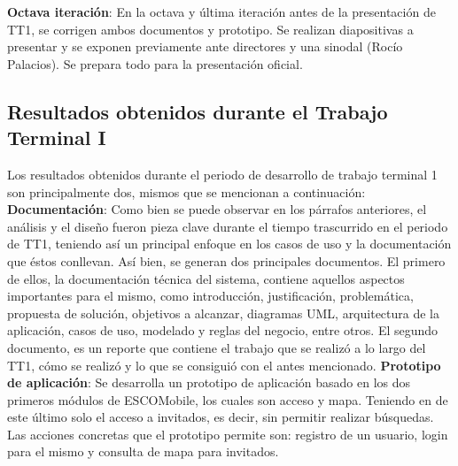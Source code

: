 \noindent
\textbf{Octava iteración}: En la octava y última iteración antes de la presentación de TT1, se corrigen ambos documentos y prototipo. Se realizan diapositivas a presentar y se exponen previamente ante directores y una sinodal (Rocío Palacios). Se prepara todo para la presentación oficial.

\subsection{Resultados obtenidos durante el Trabajo Terminal I}

\noindent
Los resultados obtenidos durante el periodo de desarrollo de trabajo terminal 1 son principalmente dos, mismos que se mencionan a continuación:
\newline
\newline
\textbf{Documentación}: Como bien se puede observar en los párrafos anteriores, el análisis y el diseño fueron pieza clave durante el tiempo trascurrido en el periodo de TT1, teniendo así un principal enfoque en los casos de uso y la documentación que éstos conllevan. Así bien, se generan dos principales documentos. El primero de ellos, la documentación técnica del sistema, contiene aquellos aspectos importantes para el mismo, como introducción, justificación, problemática, propuesta de solución, objetivos a alcanzar, diagramas UML, arquitectura de la aplicación, casos de uso, modelado y reglas del negocio, entre otros. El segundo documento, es un reporte que contiene el trabajo que se realizó a lo largo del TT1, cómo se realizó y lo que se consiguió con el antes mencionado. 
\newline
\newline
\textbf{Prototipo de aplicación}: Se desarrolla un prototipo de aplicación basado en los dos primeros módulos de ESCOMobile, los cuales son acceso y mapa. Teniendo en de este último solo el acceso a invitados, es decir, sin permitir realizar búsquedas. Las acciones concretas que el prototipo permite son: registro de un usuario, login para el mismo y consulta de mapa para invitados.